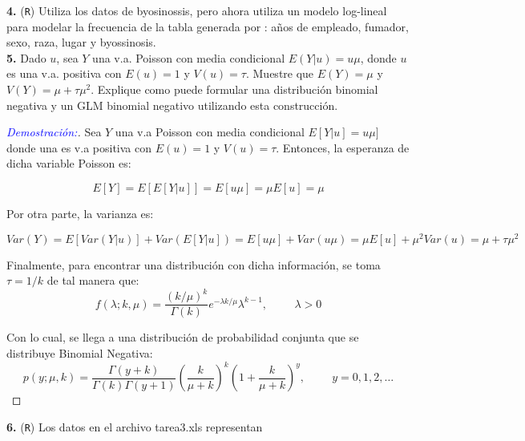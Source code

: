 \documentclass[12pt,a4paper,oneside]{article}
\begin{document}
 \noindent \textbf{4. } (\texttt{R}) Utiliza los datos de byosinossis, pero ahora utiliza un modelo log-lineal para modelar la frecuencia de la tabla generada por : años de empleado, fumador, sexo, raza, lugar y byossinosis.\\
 
 
 \noindent \textbf{5. }  Dado $u$, sea $Y$ una v.a. Poisson con media condicional $E(Y\vert u) = u\mu$, donde $u$ es una v.a. positiva con $E(u)=1$ y $V(u)=\tau$. Muestre que $E(Y ) = \mu$ y $V(Y)= \mu + \tau \mu^2$. Explique como puede formular una distribución binomial negativa y un GLM binomial negativo utilizando esta construcción.\\
 \begin{proof}[\textcolor{blue}{Demostración:}] Sea $Y$ una v.a Poisson con media condicional $E[Y|u] = u\mu]$ donde una es v.a positiva con $E(u)=1$ y $V(u)=\tau$. Entonces, la esperanza de dicha variable Poisson es:
 
 $$E[Y] = E[E[Y|u]] = E[u\mu] = \mu E[u] = \mu $$
 
 Por otra parte, la varianza es:
 
 $$Var(Y) = E[ Var(Y|u) ] + Var( E[Y|u] ) = E[ u \mu ] + Var( u\mu ) = \mu E[u] + \mu^2 Var(u) = \mu + \tau \mu^2$$
 
 Finalmente, para encontrar una distribución con dicha información, se toma $\tau = 1/k$ de tal manera que:
 $$f( \lambda; k, \mu ) = \frac{(k / \mu)^k}{\Gamma(k)} e^{-\lambda k / \mu} \lambda^{k-1}, \hspace{1cm} \lambda > 0$$
 
 Con lo cual, se llega a una distribución de probabilidad conjunta que se distribuye Binomial Negativa:
 $$p(y; \mu, k) = \frac{\Gamma(y + k)}{\Gamma(k) \Gamma(y+1)} \left(\frac{k}{\mu + k}\right)^k \left(1 + \frac{k}{\mu + k}\right)^y, \hspace{1cm} y = 0, 1, 2, \dots $$
 
 \end{proof}
 
 \noindent \textbf{6. } (\texttt{R}) Los datos en el archivo tarea3.xls representan
 
\end{document}
